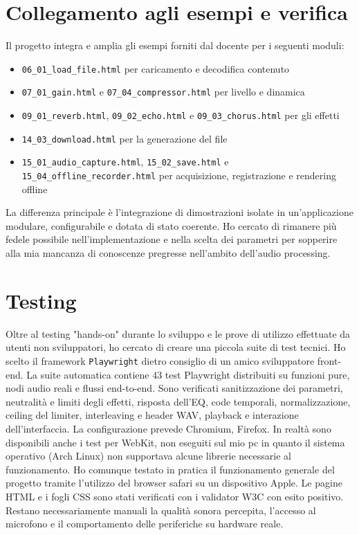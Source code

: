 \documentclass[11pt,a4paper]{article}
\begin{document}
	\section{Collegamento agli esempi e verifica}
	
	Il progetto integra e amplia gli esempi forniti dal docente per i seguenti moduli:
	
	\begin{itemize}
		\item \texttt{06\_01\_load\_file.html} per caricamento e decodifica contenuto
		\item \texttt{07\_01\_gain.html} e \texttt{07\_04\_compressor.html} per livello e dinamica
		\item \texttt{09\_01\_reverb.html}, \texttt{09\_02\_echo.html} e \texttt{09\_03\_chorus.html} per gli effetti
		\item \texttt{14\_03\_download.html} per la generazione del file
		\item \texttt{15\_01\_audio\_capture.html}, \texttt{15\_02\_save.html} e \texttt{15\_04\_offline\_recorder.html} per acquisizione, registrazione e rendering offline
	\end{itemize}
	
	La differenza principale è l'integrazione di dimostrazioni isolate in un'applicazione modulare, configurabile e dotata di stato coerente.
	Ho cercato di rimanere più fedele possibile nell'implementazione e nella scelta dei parametri per sopperire alla mia mancanza di conoscenze pregresse nell'ambito dell'audio processing.
	
	\section{Testing}
	
	Oltre al testing "hands-on" durante lo sviluppo e le prove di utilizzo effettuate da utenti non sviluppatori, ho cercato di creare una piccola suite di test tecnici.
	Ho scelto il framework \texttt{Playwright} dietro consiglio di un amico sviluppatore front-end.
	La suite automatica contiene 43 test Playwright distribuiti su funzioni pure, nodi audio reali e flussi end-to-end. Sono verificati sanitizzazione dei parametri, neutralità e limiti degli effetti, risposta dell'EQ, code temporali, normalizzazione, ceiling del limiter, interleaving e header WAV, playback e interazione dell'interfaccia. La configurazione prevede Chromium, Firefox. In realtà sono disponibili anche i test per WebKit, non eseguiti sul mio pc in quanto il sistema operativo  (Arch Linux) non supportava alcune librerie necessarie al funzionamento. Ho comunque testato in pratica il funzionamento generale del progetto tramite l'utilizzo del browser safari su un dispositivo Apple. 
	Le pagine HTML e i fogli CSS sono stati verificati con i validator W3C con esito positivo. Restano necessariamente manuali la qualità sonora percepita, l'accesso al microfono e il comportamento delle periferiche su hardware reale.
	
\end{document}
